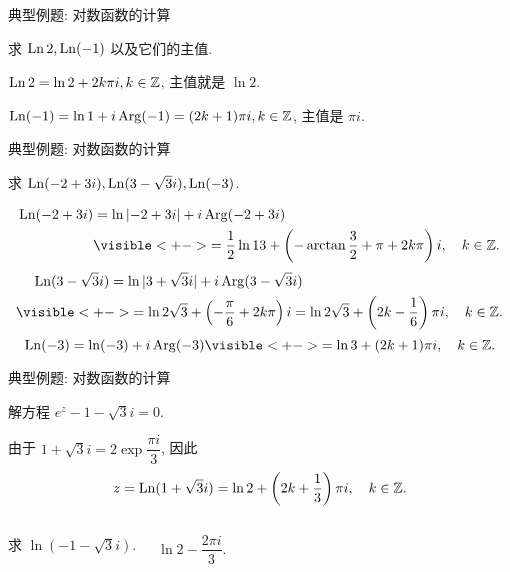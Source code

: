\begin{frame}{典型例题: 对数函数的计算}
\begin{example}
求 $\operatorname{Ln} 2,\operatorname{Ln}(-1)$ 以及它们的主值.
\end{example}

\begin{solution}
$\operatorname{Ln}2=\ln2+2k\pi i, k\in{\mathbb{Z}}$,
\onslide<+->
主值就是 $\ln 2$.

\onslide<+->
$\operatorname{Ln}(-1)=\ln1+i\operatorname{Arg}(-1)=(2k+1)\pi i, k\in{\mathbb{Z}}$,
\onslide<+->
主值是 $\pi i$.
\end{solution}
\end{frame}


\begin{frame}{典型例题: 对数函数的计算}
\begin{example}
求 $\operatorname{Ln}(-2+3i),\operatorname{Ln}(3-\sqrt3 i),\operatorname{Ln}(-3)$.
\end{example}
\begin{solution}
\vspace{-0.5\baselineskip}
\begin{align*}
\Ln(-2+3i)&=\ln\abs{-2+3i}+i\Arg(-2+3i)\\
&\visible<+->{=\frac 12\ln 13+\left(-\arctan\frac 32+\pi+2k\pi\right)i,\quad k\in\BZ.}
\end{align*}
\onslide<+->
\vspace{-1.4\baselineskip}
\begin{align*}
&\peq\Ln(3-\sqrt3i)=\ln|3+\sqrt 3i|+i\Arg(3-\sqrt 3i)\\
&\visible<+->{=\ln 2\sqrt 3+\left(-\frac\pi6+2k\pi\right)i
=\ln 2\sqrt 3+\left(2k-\frac16\right)\pi i,\quad k\in\BZ.}
\end{align*}
\onslide<+->
\vspace{-1.4\baselineskip}
\[\Ln(-3)=\ln(-3)+i\Arg(-3)
\visible<+->{=\ln3+(2k+1)\pi i,\quad k\in\BZ.}\]
\vspace{-1.4\baselineskip}
\end{solution}
\end{frame}


\begin{frame}[<*>]{典型例题: 对数函数的计算}
\onslide<+->
\begin{example}
解方程 $e^z-1-\sqrt 3i=0$.
\end{example}
\onslide<+->
\begin{solution}
由于 $1+\sqrt 3 i=2\exp\dfrac{\pi i}3$,
\onslide<+->
因此
\[z=\operatorname{Ln}(1+\sqrt 3i)=\ln 2+\left(2k+\frac13\right)\pi i,\quad k\in{\mathbb{Z}}.\]
\end{solution}
\onslide<+->
\begin{columns}
		\begin{exercise}
		求 $\ln(-1-\sqrt3 i)$.
		\end{exercise}
		\onslide<+->
		\begin{answer}
		$\ln 2-\dfrac{2\pi i}3$.
		\end{answer}
\end{columns}
\end{frame}


